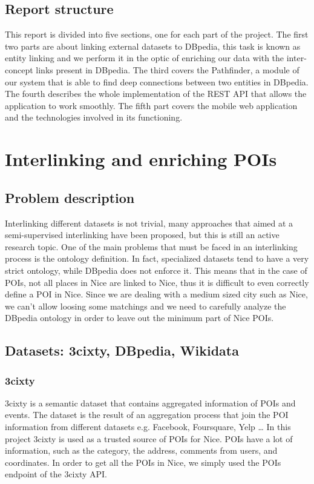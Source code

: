 \documentclass[paper=a4, fontsize=11pt]{scrartcl}
\begin{document}
\subsection{Report structure}
This report is divided into five sections, one for each part of the project. The first two parts are about linking external datasets to DBpedia, this task is known as entity linking and we perform it in the optic of enriching our data with the inter-concept links present in DBpedia.
The third covers the Pathfinder, a module of our system that is able to find deep connections between two entities in DBpedia.
The fourth describes the whole implementation of the REST API that allows the application to work smoothly.
The fifth part covers the mobile web application and the technologies involved in its functioning.

\section{Interlinking and enriching POIs}
\subsection{Problem description}
Interlinking different datasets is not trivial, many approaches that aimed at a semi-supervised interlinking have been proposed, but this is still an active research topic.
One of the main problems that must be faced in an interlinking process is the ontology definition. In fact, specialized datasets tend to have a very strict ontology, while DBpedia does not enforce it. This means that in the case of POIs, not all places in Nice are linked to Nice, thus it is difficult to even correctly define a POI in Nice.
Since we are dealing with a medium sized city such as Nice, we can't allow loosing some matchings and we need to carefully analyze the DBpedia ontology in order to leave out the minimum part of Nice POIs.

\subsection{Datasets: 3cixty, DBpedia, Wikidata}
\subsubsection{3cixty}
3cixty is a semantic dataset that contains aggregated information of POIs and events. The dataset is the result of an aggregation process that join the POI information from different datasets e.g. Facebook, Foursquare, Yelp \dots
In this project 3cixty is used as a trusted source of POIs for Nice.
POIs have a lot of information, such as the category, the address, comments from users, and coordinates. In order to get all the POIs in Nice, we simply used the POIs endpoint of the 3cixty API.
\end{document}
